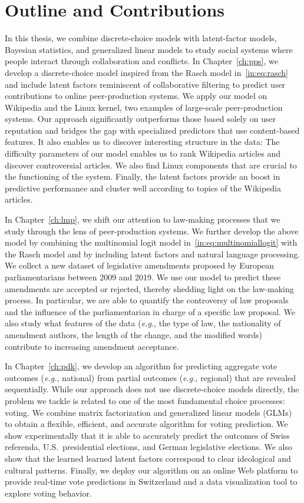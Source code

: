 \section{Outline and Contributions}
\label{in:sec:outline}

In this thesis, we combine discrete-choice models with latent-factor models, Bayesian statistics, and generalized linear models to study social systems where people interact through collaboration and conflicts.
In Chapter~\ref{ch:pps}, we develop a discrete-choice model inspired from the Rasch model in~\eqref{in:eq:rasch} and include latent factors reminiscent of collaborative filtering to predict user contributions to online peer-production systems.
We apply our model on Wikipedia and the Linux kernel, two examples of large-scale peer-production systems.
Our approach significantly outperforms those based solely on user reputation and bridges the gap with specialized predictors that use content-based features.
It also enables us to discover interesting structure in the data:
The difficulty parameters of our model enables us to rank Wikipedia articles and discover controversial articles.
We also find Linux components that are crucial to the functioning of the system.
Finally, the latent factors provide an boost in predictive performance and cluster well according to topics of the Wikipedia articles.

In Chapter~\ref{ch:lmp}, we shift our attention to law-making processes that we study through the lens of peer-production systems.
We further develop the above model by combining the multinomial logit model in~\eqref{in:eq:multinomiallogit} with the Rasch model and by including latent factors and natural language processing.
We collect a new dataset of  legislative amendments proposed by European parliamentarians between 2009 and 2019.
We use our model to predict these amendments are accepted or rejected, thereby shedding light on the law-making process.
In particular, we are able to quantify the controversy of law proposals and the influence of the parliamentarian in charge of a specific law proposal.
We also study what features of the data (\textit{e.g.}, the type of law, the nationality of amendment authors, the length of the change, and the modified words) contribute to increasing amendment acceptance.

In Chapter~\ref{ch:pdk}, we develop an algorithm for predicting aggregate vote outcomes (\textit{e.g.}, national) from partial outcomes (\textit{e.g.}, regional) that are revealed sequentially.
While our approach does not use discrete-choice models directly, the problem we tackle is related to one of the most fundamental choice processes: voting.
We combine matrix factorization and generalized linear models (GLMs) to obtain a flexible, efficient, and accurate algorithm for voting prediction.
We show experimentally that it is able to accurately predict the outcomes of Swiss referenda, U.S.\ presidential elections, and German legislative elections.
We also show that the learned learned latent factors correspond to clear ideological and cultural patterns.
Finally, we deploy our algorithm on an online Web platform to provide real-time vote predictions in Switzerland and a data visualization tool to explore voting behavior.

